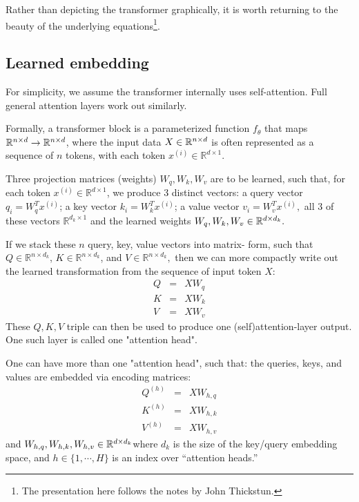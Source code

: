 Rather than depicting the transformer graphically, it is worth returning to the beauty of the underlying equations\footnote{The presentation here follows the notes by John Thickstun.}.





%
%
%

%
\subsection{Learned embedding}\label{sec-learnedembedding}
For simplicity, we assume the transformer internally uses self-attention. Full general attention layers work out similarly.

Formally, a transformer block is a parameterized function $f_\theta$ that maps $\mathbb{R}^{n\times d}\rightarrow \mathbb{R}^{n\times d}$, where the input data $X \in \mathbb{R}^{n\times d}$ is often represented as a sequence of $n$ tokens, with each token $x^{(i)}\in \mathbb{R}^{d\times 1}.$


Three projection matrices (weights) $W_{q}, W_k, W_v$ are to be learned, such that, for each token $x^{(i)}\in \mathbb{R}^{d\times 1}$, we produce 3 distinct vectors: a query vector $q_i = W_q^T x^{(i)}$; a key vector $k_i = W_k^T x^{(i)}$; a value vector $v_i = W_v^T x^{(i)},$ all 3 of these vectors $\mathbb{R}^{d_k\times 1}$ and the learned weights $W_{q}, W_{k}, W_{v} \in \mathbb{R}^{d\times d_k}.$

If we stack these $n$ query, key, value vectors into matrix- form, such that $Q\in \mathbb{R}^{n\times d_k}$, $K\in \mathbb{R}^{n\times d_k}$, and $V\in \mathbb{R}^{n\times d_k},$ then we can more compactly write out the learned transformation from the sequence of input token $X$:
\begin{eqnarray*}
  Q &=& X W_{q}
  \\
  K &=& X W_{k}
  \\
  V &=& X W_{v}
\end{eqnarray*}
These $Q, K, V$ triple can then be used to produce one (self)attention-layer output. One such layer is called one "attention head".

One can have more than one "attention head", such that: the queries, keys, and values are embedded via encoding matrices:
\begin{eqnarray}
  Q^{(h)} &=& X W_{h,q}
  \\
  K^{(h)} &=& X W_{h,k}
  \\
  V^{(h)} &=& X W_{h,v}
\end{eqnarray}
and $W_{h,q}, W_{h,k}, W_{h,v} \in \mathbb{R}^{d\times d_k}$where $d_k$ is the size of the key/query embedding space, and $h \in \{1,\cdots,H\}$ is an index over ``attention heads.'' 


